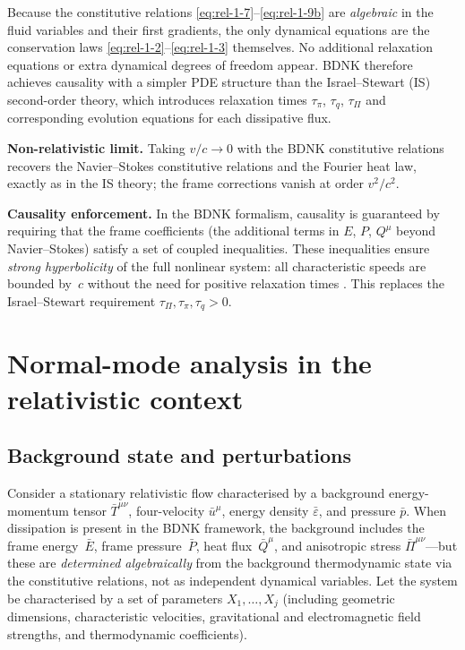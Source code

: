 Because the constitutive relations \eqref{eq:rel-1-7}--\eqref{eq:rel-1-9b}
are \emph{algebraic} in the fluid variables and their first gradients,
the only dynamical equations are the conservation laws
\eqref{eq:rel-1-2}--\eqref{eq:rel-1-3} themselves.  No additional
relaxation equations or extra dynamical degrees of freedom appear.
BDNK therefore achieves causality with a simpler PDE structure than
the Israel--Stewart (IS) second-order theory, which introduces
relaxation times $\tau_{\pi}$, $\tau_{q}$, $\tau_{\Pi}$ and
corresponding evolution equations for each dissipative flux.

\noindent\textbf{Non-relativistic limit.}  Taking $v/c\to 0$ with
the BDNK constitutive relations recovers the Navier--Stokes
constitutive relations and the Fourier heat law, exactly as in the IS
theory; the frame corrections vanish at order $v^{2}/c^{2}$.

\noindent\textbf{Causality enforcement.}  In the BDNK formalism,
causality is guaranteed by requiring that the frame coefficients
(the additional terms in $E$, $P$, $Q^{\mu}$ beyond Navier--Stokes)
satisfy a set of coupled inequalities.  These inequalities ensure
\emph{strong hyperbolicity} of the full nonlinear system: all
characteristic speeds are bounded by~$c$ without the need for
positive relaxation times \cite{BemficaDN2018,Kovtun2019}.  This
replaces the Israel--Stewart requirement $\tau_{\Pi},\tau_{\pi},
\tau_{q}>0$.

\section{Normal-mode analysis in the relativistic context}
\label{sec:rel-1-3}

\subsection{Background state and perturbations}

Consider a stationary relativistic flow characterised by a background
energy-momentum tensor $\bar T^{\mu\nu}$, four-velocity
$\bar u^{\mu}$, energy density $\bar\varepsilon$, and pressure
$\bar p$.  When dissipation is present in the BDNK framework, the
background includes the frame energy~$\bar E$, frame pressure~$\bar P$,
heat flux~$\bar Q^{\mu}$, and anisotropic stress
$\bar\Pi^{\mu\nu}$---but these are \emph{determined algebraically}
from the background thermodynamic state via the constitutive
relations, not as independent dynamical variables.  Let the system be
characterised by a set of parameters $X_1,\ldots,X_j$ (including
geometric dimensions, characteristic velocities, gravitational and
electromagnetic field strengths, and thermodynamic coefficients).

